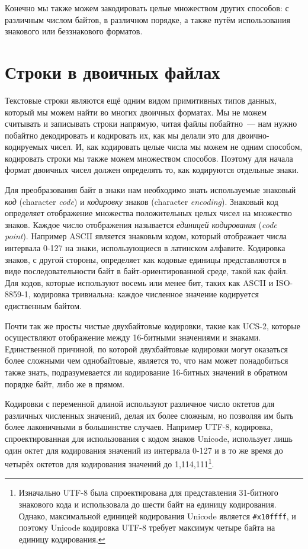 Конечно мы также можем закодировать целые множеством других способов: с различным числом
байтов, в различном порядке, а также путём использования знакового или беззнакового
форматов.

\section{Строки в двоичных файлах}

Текстовые строки являются ещё одним видом примитивных типов данных, который мы можем найти
во многих двоичных форматах. Мы не можем считывать и записывать строки напрямую, читая
файлы побайтно~--- нам нужно побайтно декодировать и кодировать их, как мы делали это для
двоично-кодируемых чисел. И, как кодировать целые числа мы можем не одним способом,
кодировать строки мы также можем множеством способов. Поэтому для начала формат двоичных
чисел должен определять то, как кодируются отдельные знаки.

Для преобразования байт в знаки нам необходимо знать используемые знаковый \textit{код}
(character \textit{code}) и \textit{кодировку} знаков (character
\textit{encoding}). Знаковый код определяет отображение множества положительных целых
чисел на множество знаков. Каждое число отображения называется \textit{единицей
  кодирования} (\textit{code point}). Например ASCII является знаковым кодом, который
отображает числа интервала 0-127 на знаки, использующиеся в латинском алфавите. Кодировка
знаков, с другой стороны, определяет как кодовые единицы представляются в виде
последовательности байт в байт-ориентированной среде, такой как файл. Для кодов, которые
используют восемь или менее бит, таких как ASCII и ISO-8859-1, кодировка тривиальна:
каждое численное значение кодируется едиственным байтом.

Почти так же просты чистые двухбайтовые кодировки, такие как UCS-2, которые осуществляют
отображение между 16-битными значениями и знаками. Единственной причиной, по которой
двухбайтовые кодировки могут оказаться более сложными чем однобайтовые, является то, что
нам может понадобиться также знать, подразумевается ли кодирование 16-битных значений в
обратном порядке байт, либо же в прямом.

Кодировки с переменной длиной используют различное число октетов для различных численных
значений, делая их более сложным, но позволяя им быть более лаконичными в большинстве
случаев. Например UTF-8, кодировка, спроектированная для использования с кодом знаков
Unicode, использует лишь один октет для кодирования значений из интервала 0-127 и в то же
время до четырёх октетов для кодирования значений до 1,114,111\footnote{Изначально UTF-8
  была спроектирована для представления 31-битного знакового кода и использовала до шести
  байт на единицу кодирования. Однако, максимальной единицей кодирования Unicode является
  \lstinline!#x10ffff!, и поэтому Unicode кодировка UTF-8 требует максимум четыре байта на
  единицу кодирования.}.

